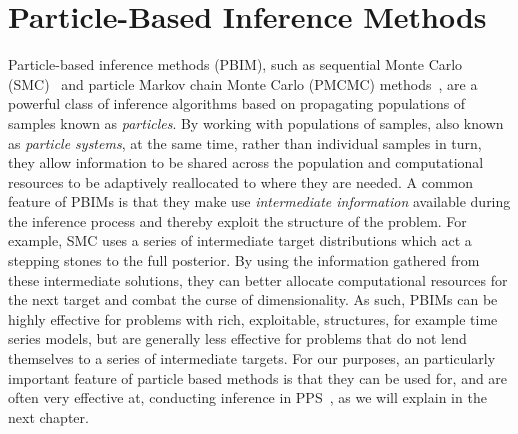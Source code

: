
\chapter{Particle-Based Inference Methods}
\label{chp:part}

Particle-based inference methods (PBIM), such as sequential Monte Carlo (SMC)~\citep{gordon1993novel,doucet2001introduction} and 
particle Markov chain Monte Carlo (PMCMC) methods~\citep{andrieu2009pseudo,rainforth2016interacting},
are a powerful class of inference algorithms based on propagating populations of samples
known as \emph{particles}.  By working with populations of samples, also known as \emph{particle systems},
 at the same time, rather than individual
samples in turn, they allow information to be shared across the population and computational
resources to be adaptively reallocated to where they are needed.  A common feature of PBIMs is
that they make use \emph{intermediate information} available during the inference process and thereby
exploit the structure of the problem.  For example, SMC uses a series of intermediate target distributions
which act a stepping stones to the full posterior.  By using the information gathered from these intermediate
solutions, they can better allocate computational resources for the next target and combat the curse of
dimensionality.  As such, PBIMs can be highly effective for problems with rich, exploitable, structures, 
for example time series models, but are generally less effective for problems that do not lend themselves
to a series of intermediate targets.  For our purposes, an particularly important feature of particle based
methods is that they can be used for, and are often very effective at, conducting inference in PPS~\citep{wood2014new}, as we will
explain in the next chapter.





%
%
